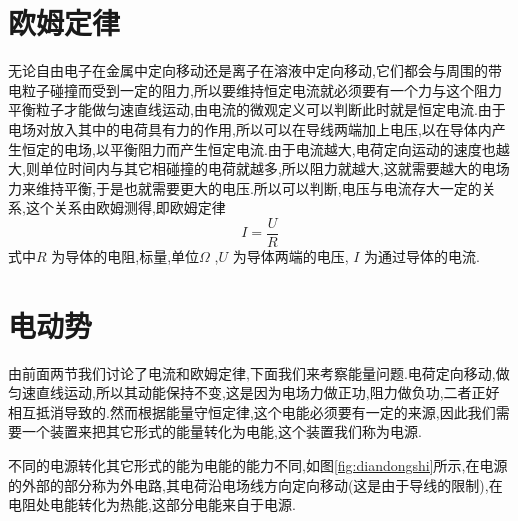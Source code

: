 \section{欧姆定律}

无论自由电子在金属中定向移动还是离子在溶液中定向移动,它们都会与周围的带电粒子碰撞而受到一定的阻力,所以要维持恒定电流就必须要有一个力与这个阻力平衡粒子才能做匀速直线运动,由电流的微观定义可以判断此时就是恒定电流.由于电场对放入其中的电荷具有力的作用,所以可以在导线两端加上电压,以在导体内产生恒定的电场,以平衡阻力而产生恒定电流.由于电流越大,电荷定向运动的速度也越大,则单位时间内与其它相碰撞的电荷就越多,所以阻力就越大,这就需要越大的电场力来维持平衡,于是也就需要更大的电压.所以可以判断,电压与电流存大一定的关系,这个关系由欧姆测得,即欧姆定律
\begin{equation}
  I=\frac{U}{R}
  \label{eq:ohmlaw0}
\end{equation}
式中$R$ 为导体的电阻,标量,单位$\Omega$ ,$U$ 为导体两端的电压, $I$ 为通过导体的电流.

\section{电动势}

由前面两节我们讨论了电流和欧姆定律,下面我们来考察能量问题.电荷定向移动,做匀速直线运动,所以其动能保持不变,这是因为电场力做正功,阻力做负功,二者正好相互抵消导致的.然而根据能量守恒定律,这个电能必须要有一定的来源,因此我们需要一个装置来把其它形式的能量转化为电能,这个装置我们称为电源.

不同的电源转化其它形式的能为电能的能力不同,如图\ref{fig:diandongshi}所示,在电源的外部的部分称为外电路,其电荷沿电场线方向定向移动(这是由于导线的限制),在电阻处电能转化为热能,这部分电能来自于电源.

